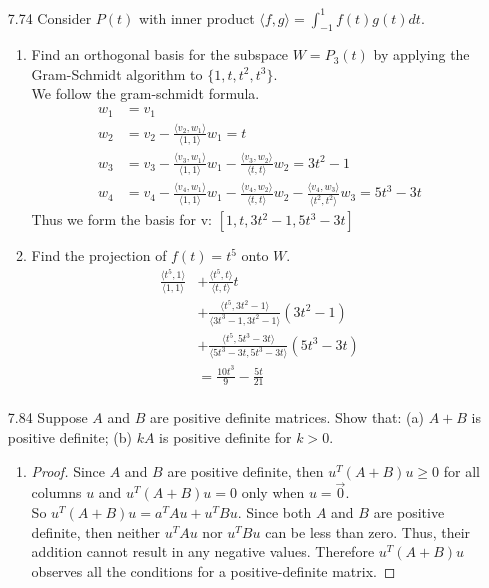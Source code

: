 \documentclass[12pt]{article}
\theoremstyle{definition}
\theoremstyle{plain}
\begin{document}
\begin{enumerate}
\item[7.74]Consider $P(t)$ with inner product $\langle f,g \rangle = \int_{-1}^1f(t)g(t)dt$.
	\begin{enumerate}
	\item Find an orthogonal basis for the subspace $W=P_3(t)$ by applying the Gram-Schmidt algorithm to $\{1,t,t^2,t^3\}$.\\
	We follow the gram-schmidt formula.
	\begin{align*}
		w_1&=v_1\\
		w_2&=v_2-\frac{\langle v_2,w_1\rangle}{\langle 1,1 \rangle}w_1 = t\\
		w_3&=v_3-\frac{\langle v_3,w_1 \rangle}{\langle 1,1 \rangle}w_1-\frac{\langle v_3,w_2\rangle}{\langle t,t \rangle}w_2 = 3t^2-1\\
		w_4&=v_4-\frac{\langle v_4,w_1\rangle}{\langle 1,1 \rangle}w_1-\frac{\langle v_4,w_2\rangle}{\langle t,t \rangle}w_2-\frac{\langle v_4,w_3\rangle}{\langle t^2,t^2 \rangle}w_3 = 5t^3-3t
	\end{align*}
	Thus we form the basis for v: $[1,t,3t^2-1,5t^3-3t]$
	\item Find the projection of $f(t)=t^5$ onto $W$.
	\begin{align*}
	\frac{\langle t^5,1 \rangle}{\langle 1,1 \rangle} &+ \frac{\langle t^5,t \rangle}{\langle t,t \rangle}t\\
	&+ \frac{\langle t^5,3t^2-1 \rangle}{\langle 3t^3-1,3t^2-1 \rangle}(3t^2-1)\\
	&+ \frac{\langle t^5,5t^3-3t \rangle}{\langle 5t^3-3t,5t^3-3t \rangle}(5t^3-3t)\\
	&= \frac{10t^3}{9}-\frac{5t}{21}\\
	\end{align*}
	\end{enumerate}
	
\item[7.84] Suppose $A$ and $B$ are positive definite matrices. Show that: (a) $A+B$ is positive definite; (b) $kA$ is positive definite for $k>0$.
	\begin{enumerate}
	\item
	\begin{proof}
	Since $A$ and $B$ are positive definite, then $u^T(A+B)u \geq 0$ for all columns $u$ and $u^T(A+B)u=0$ only when $u=\vec{0}$.\\
	So $u^T(A+B)u=a^TAu+u^TBu$. Since both $A$ and $B$ are positive definite, then neither $u^TAu$ nor $u^TBu$ can be less than zero. Thus, their addition cannot result in any negative values. Therefore $u^T(A+B)u$ observes all the conditions for a positive-definite matrix.
	\end{proof}
	\end{enumerate}
\end{enumerate}
\end{document}
